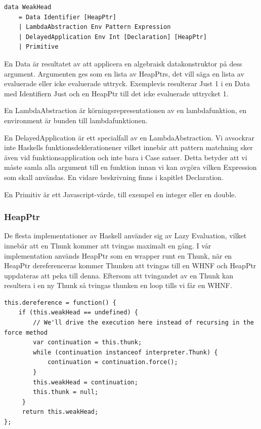 \begin{lstlisting}
data WeakHead 
    = Data Identifier [HeapPtr]
    | LambdaAbstraction Env Pattern Expression
    | DelayedApplication Env Int [Declaration] [HeapPtr]
    | Primitive
\end{lstlisting}

En Data är resultatet av att applicera en algebraisk datakonstruktor på dess argument. Argumenten ges som en lista av HeapPtrs, det vill säga en lista av evaluerade eller icke evaluerade uttryck. Exemplevis resulterar Just 1 i en Data med Identifiern Just och en HeapPtr till det icke evaluerade uttrycket 1.

En LambdaAbstraction är körningsrepresentationen av en lambdafunktion, en environment är bunden till lambdafunktionen.

En DelayedApplication är ett specialfall av en LambdaAbstraction. Vi avsockrar inte Haskells funktionsdeklerationener vilket innebär att pattern matchning sker även vid funktionsapplication och inte bara i Case satser. Detta betyder att vi måste samla alla argument till en funktion innan vi kan avgöra vilken Expression som skall användas. En vidare beskrivning finns i kapitlet Declaration.

En Primitiv är ett Javascript-värde, till exempel en integer eller en double.

\subsubsection{HeapPtr}
De flesta implementationer av Haskell använder sig av Lazy Evaluation, vilket innebär att en Thunk kommer att tvingas maximalt en gång. I vår implementation används HeapPtr som en wrapper runt en Thunk, när en HeapPtr dereferenceras kommer Thunken att tvingas till en WHNF och HeapPtr uppdateras att peka till denna. Eftersom att tvingandet av en Thunk kan resultera i en ny Thunk så tvingas thunken en loop tills vi får en WHNF.

\begin{lstlisting}
this.dereference = function() {
    if (this.weakHead == undefined) {
        // We'll drive the execution here instead of recursing in the force method
        var continuation = this.thunk;
        while (continuation instanceof interpreter.Thunk) {
            continuation = continuation.force();
        }
        this.weakHead = continuation;
        this.thunk = null;
     }
     return this.weakHead;
};
\end{lstlisting}

